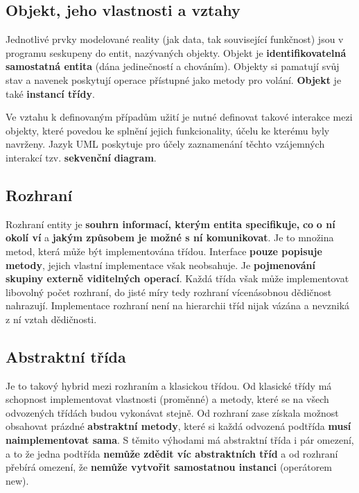 \subsection{Objekt, jeho vlastnosti a vztahy}
Jednotlivé prvky modelované reality (jak data, tak související funkčnost) jsou v programu seskupeny do entit, nazývaných objekty. Objekt je \textbf{identifikovatelná samostatná entita} (dána jedinečností a chováním). Objekty si pamatují svůj stav a navenek poskytují operace přístupné jako metody pro volání. \textbf{Objekt} je také \textbf{instancí třídy}.

Ve vztahu k definovaným případům užití je nutné definovat takové interakce mezi objekty, které povedou ke splnění jejich funkcionality, účelu ke kterému byly navrženy. Jazyk UML poskytuje pro účely zaznamenání těchto vzájemných interakcí tzv. \textbf{sekvenční} \textbf{diagram}.

\subsection{Rozhraní}
Rozhraní entity je \textbf{souhrn informací, kterým entita specifikuje,} \textbf{co} \textbf{o ní okolí ví} a\textbf{ jakým způsobem je možné s ní komunikovat}. Je to množina metod, která může být implementována třídou. Interface \textbf{pouze popisuje metody}, jejich vlastní implementace však neobsahuje. Je \textbf{pojmenování skupiny externě viditelných operací}. Každá třída však může implementovat libovolný počet rozhraní, do jisté míry tedy rozhraní vícenásobnou dědičnost nahrazují. Implementace rozhraní není na hierarchii tříd nijak vázána a nevzniká z ní vztah dědičnosti.

\subsection{Abstraktní třída}
Je to takový hybrid mezi rozhraním a klasickou třídou. Od klasické třídy má schopnost implementovat vlastnosti (proměnné) a metody, které se na všech odvozených třídách budou vykonávat stejně. Od rozhraní zase získala možnost obsahovat prázdné \textbf{abstraktní metody}, které si každá odvozená podtřída \textbf{musí naimplementovat sama}. S těmito výhodami má abstraktní třída i pár omezení, a to že jedna podtřída \textbf{nemůže zdědit víc abstraktních tříd} a od rozhraní přebírá omezení, že \textbf{nemůže vytvořit samostatnou instanci} (operátorem new).

